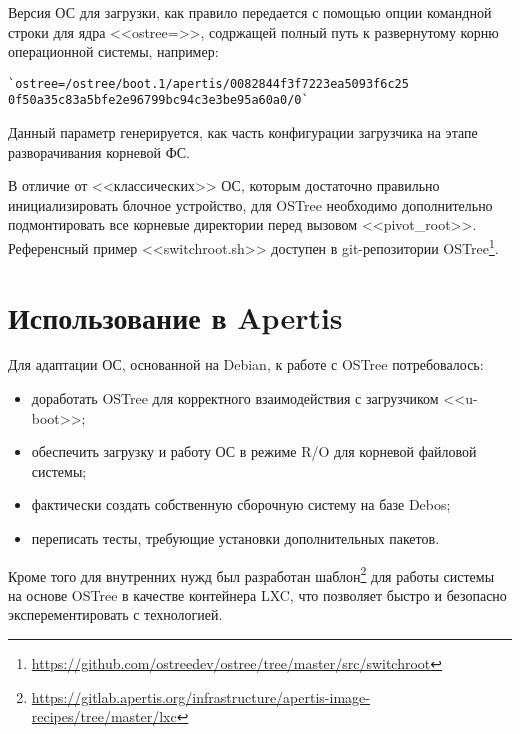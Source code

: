 \documentclass[10pt, a5paper]{article}
\begin{document}
Версия ОС для загрузки, как правило передается с помощью опции командной строки для ядра <<ostree=>>, содржащей полный путь к развернутому корню операционной системы, например:

\begin{verbatim}
`ostree=/ostree/boot.1/apertis/0082844f3f7223ea5093f6c25
0f50a35c83a5bfe2e96799bc94c3e3be95a60a0/0`\end{verbatim}
Данный параметр генерируется, как часть конфигурации загрузчика на этапе разворачивания корневой ФС.

В отличие от <<классических>> ОС, которым достаточно правильно инициализировать блочное устройство, для OSTree необходимо дополнительно подмонтировать все корневые директории перед вызовом <<pivot\_root>>. Референсный пример <<switchroot.sh>> доступен в git-репозитории OSTree\footnote{\url{https://github.com/ostreedev/ostree/tree/master/src/switchroot}}.

\section*{Использование в Apertis}

Для адаптации ОС, основанной на Debian, к работе с OSTree потребовалось:

\begin{itemize}
  \item доработать OSTree для корректного взаимодействия с загрузчиком <<u-boot>>;
  \item обеспечить загрузку и работу ОС в режиме R/O для корневой файловой системы;
  \item фактически создать собственную сборочную систему на базе Debos;
  \item переписать тесты, требующие установки дополнительных пакетов.
\end{itemize}

Кроме того для внутренних нужд был разработан шаблон\footnote{\url{https://gitlab.apertis.org/infrastructure/apertis-image-recipes/tree/master/lxc}} для работы системы на основе OSTree в качестве контейнера LXC, что позволяет быстро и безопасно эксперементировать с технологией.
\end{document}
